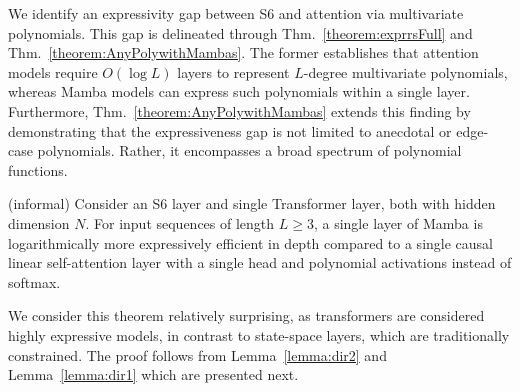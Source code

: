 We identify an expressivity gap between S6 and attention via multivariate polynomials. %
This gap is delineated through Thm.~\ref{theorem:exprrsFull} and Thm.~\ref{theorem:AnyPolywithMambas}. The former establishes that attention models require $O(\log L)$ layers to represent $L$-degree multivariate polynomials, whereas Mamba models can express such polynomials within a single layer. Furthermore, Thm.~\ref{theorem:AnyPolywithMambas} extends this finding by demonstrating that the expressiveness gap is not limited to anecdotal or edge-case polynomials. Rather, it encompasses a broad spectrum of polynomial functions.


\begin{theorem}\label{theorem:exprrsFull}(informal)
Consider an S6 layer and single Transformer layer, both with hidden dimension $N$. 
For input sequences of length \( L \geq 3 \), a single layer of Mamba is logarithmically more expressively efficient in depth compared to a single causal {\color{black}linear} self-attention layer with a single head and polynomial activations instead of softmax. 
\end{theorem}

We consider this theorem relatively surprising, as transformers are considered highly expressive models, in contrast to state-space layers, which are traditionally constrained. The proof follows from Lemma~\ref{lemma:dir2} and Lemma~\ref{lemma:dir1} which are presented next.

